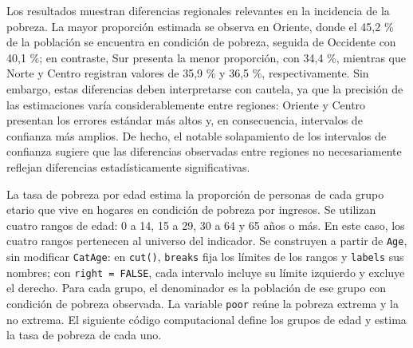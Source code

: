 \documentclass[
  spanish,
  11pt,
  letterpaper,
  oneside,
  open=any]{scrbook}
\begin{document}
Los resultados muestran diferencias regionales relevantes en la
incidencia de la pobreza. La mayor proporción estimada se observa en
Oriente, donde el 45,2 \% de la población se encuentra en condición de
pobreza, seguida de Occidente con 40,1 \%; en contraste, Sur presenta la
menor proporción, con 34,4 \%, mientras que Norte y Centro registran
valores de 35,9 \% y 36,5 \%, respectivamente. Sin embargo, estas
diferencias deben interpretarse con cautela, ya que la precisión de las
estimaciones varía considerablemente entre regiones: Oriente y Centro
presentan los errores estándar más altos y, en consecuencia, intervalos
de confianza más amplios. De hecho, el notable solapamiento de los
intervalos de confianza sugiere que las diferencias observadas entre
regiones no necesariamente reflejan diferencias estadísticamente
significativas.

La tasa de pobreza por edad estima la proporción de personas de cada
grupo etario que vive en hogares en condición de pobreza por ingresos.
Se utilizan cuatro rangos de edad: 0 a 14, 15 a 29, 30 a 64 y 65 años o
más. En este caso, los cuatro rangos pertenecen al universo del
indicador. Se construyen a partir de \texttt{Age}, sin modificar
\texttt{CatAge}: en \texttt{cut()}, \texttt{breaks} fija los límites de
los rangos y \texttt{labels} sus nombres; con \texttt{right\ =\ FALSE},
cada intervalo incluye su límite izquierdo y excluye el derecho. Para
cada grupo, el denominador es la población de ese grupo con condición de
pobreza observada. La variable \texttt{poor} reúne la pobreza extrema y
la no extrema. El siguiente código computacional define los grupos de
edad y estima la tasa de pobreza de cada uno.
\end{document}
